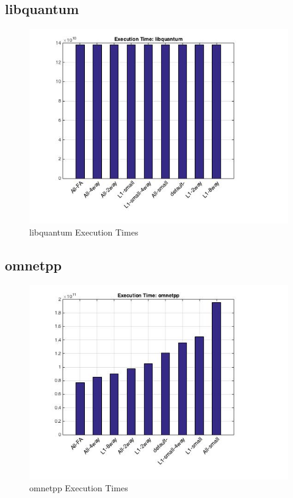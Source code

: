 \documentclass[11pt,titlepage]{article}
\begin{document}
    \subsection{libquantum}
	\begin{figure}[H]
            \centering
            \includegraphics[scale=0.75]{etlibquantum}
            \caption{libquantum Execution Times}
            \label{fig:etlibquantum}
        \end{figure}

    \subsection{omnetpp}
	\begin{figure}[H]
            \centering
            \includegraphics[scale=0.75]{etomnetpp}
            \caption{omnetpp Execution Times}
            \label{fig:etomnetpp}
        \end{figure}
\end{document}
